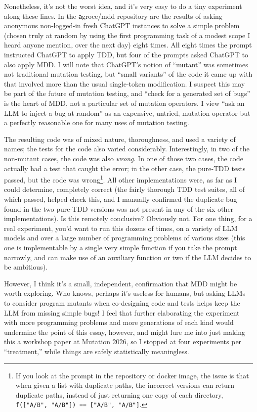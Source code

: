 \documentclass[sigplan,screen]{acmart}
\begin{document}
Nonetheless, it's not the worst idea, and it's very easy to do a tiny
experiment along these lines.  In
the {\texttt agroce/mdd} repository are the results of asking
anonymous non-logged-in fresh ChatGPT instances to solve a simple problem
(chosen truly at random by using the first programming task of a modest
scope I heard anyone mention, over the next day) eight
times.  All eight times the prompt instructed ChatGPT to apply TDD,
but four of the prompts asked ChatGPT to also apply
MDD.  I will note that ChatGPT's notion of ``mutant'' was sometimes
not traditional mutation testing, but ``small variants'' of the code
it came up with that involved more than the usual single-token
modification.  I suspect this may be part of the future of mutation
testing, and ``check for a generated set of bugs'' is the heart of
MDD, not a particular set of mutation operators.  I view ``ask an LLM
to inject a bug at random'' as an expensive, untried, mutation
operator but a perfectly reasonable one for many uses of mutation testing.

The resulting code was of mixed nature, thoroughness, and used a
variety of names; the tests for the code also varied considerably.  Interestingly, in two of the non-mutant cases, the code
was also \emph{wrong}.  In one of those two cases, the code actually had a test that
caught the error; in the other case, the pure-TDD tests passed, but the code
was wrong\footnote{If you look at the prompt in the repository or
  docker image, the issue is that when given a list with duplicate
  paths, the incorrect versions can return duplicate paths, instead of
  just returning one copy of each directory, {\tt f(["A/B", "A/B"]) ==
    ["A/B", "A/B"]}.}.  All other implementations were, as far as I
could determine, completely correct (the fairly thorough TDD test suites, all of which passed,
helped check this, and I manually confirmed the duplicate bug found in
the two pure-TDD versions was not present in any of the six other implementations).  Is this remotely
conclusive?  Obviously not. For one thing, for a real experiment,
you'd want to run this dozens of times, on a variety of LLM models and
over a large number of programming problems of various sizes (this one
is implementable by a single very simple function if you take the
prompt narrowly, and can make use of an auxiliary function or two if
the LLM decides to be ambitious).

However, I think it's a small, independent, confirmation that MDD
might be worth exploring.  Who knows, perhaps it's useless for humans,
but asking LLMs to consider program mutants when co-designing code and
tests helps keep the LLM from missing simple bugs!  I feel that further
elaborating the experiment with more programming problems and more
generations of each kind would undermine the point of this essay,
however, and might lure me into just making this a workshop paper at
Mutation 2026, so I stopped at four experiments per ``treatment,''
while things are safely
statistically meaningless.
\end{document}
